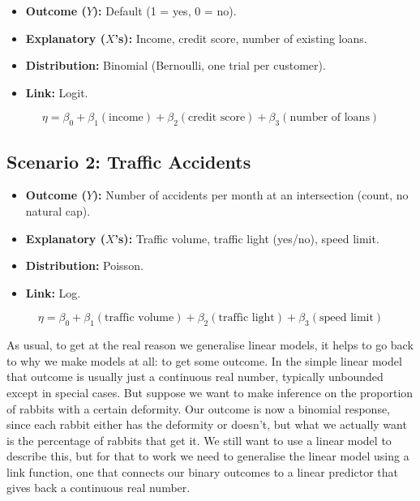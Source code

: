 \begin{itemize}
\item \textbf{Outcome ($Y$):} Default (1 = yes, 0 = no).
\item \textbf{Explanatory ($X$'s):} Income, credit score, number of existing loans.
\item \textbf{Distribution:} Binomial (Bernoulli, one trial per customer).
\item \textbf{Link:} Logit.
\end{itemize}
\begin{mathbox}
\[
\eta = \beta_0 + \beta_1(\text{income}) + \beta_2(\text{credit score}) + \beta_3(\text{number of loans})
\]
\end{mathbox}

\subsection*{Scenario 2: Traffic Accidents}
\begin{itemize}
\item \textbf{Outcome ($Y$):} Number of accidents per month at an intersection (count, no natural cap).
\item \textbf{Explanatory ($X$'s):} Traffic volume, traffic light (yes/no), speed limit.
\item \textbf{Distribution:} Poisson.
\item \textbf{Link:} Log.
\end{itemize}
\begin{mathbox}
\[
\eta = \beta_0 + \beta_1(\text{traffic volume}) + \beta_2(\text{traffic light}) + \beta_3(\text{speed limit})
\]
\end{mathbox}

\begin{questionbox}
As usual, to get at the real reason we generalise linear models, it helps to go back to why we make models at all: to get some outcome. In the simple linear model that outcome is usually just a continuous real number, typically unbounded except in special cases. But suppose we want to make inference on the proportion of rabbits with a certain deformity. Our outcome is now a binomial response, since each rabbit either has the deformity or doesn't, but what we actually want is the percentage of rabbits that get it. We still want to use a linear model to describe this, but for that to work we need to generalise the linear model using a link function, one that connects our binary outcomes to a linear predictor that gives back a continuous real number.
\end{questionbox}



